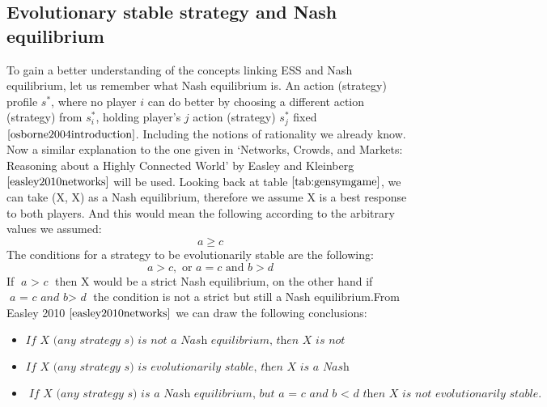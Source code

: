 \subsection{Evolutionary stable strategy and Nash equilibrium} \label{EESNE}
To gain a better understanding of the concepts linking ESS and Nash equilibrium, let us remember what Nash equilibrium is. 
An action (strategy) profile $s^*$, where no player $\textit{i}$ can do better by choosing a different action (strategy) from $s^*_i$, holding player’s $\textit{j}$ action (strategy) $s^*_{j}$ fixed $\cite{osborne2004introduction}$.  Including the notions of rationality we already know.   
Now a similar explanation to the one given in `Networks, Crowds, and Markets: Reasoning about a Highly Connected World'  by Easley and Kleinberg$\cite{easley2010networks}$ will be used.
Looking back at table $\ref{tab:gensymgame}$, we can take (X, X) as a Nash equilibrium, therefore we assume X is a best response to both players. And this would mean the following according to the arbitrary values we assumed:
\begin{equation}
{a \geq c}
\end{equation}
The conditions for a strategy to be evolutionarily stable are the following:
\begin{equation}
{a > c, \text{ or } a = c \text{ and } b > d}
\end{equation}
If $\textit{a $>$ c}$ then X would be a strict Nash equilibrium, on the other hand if $\textit{a = c and b$>$ d}$ the condition is not a strict but still a Nash equilibrium.From Easley 2010 $\cite{easley2010networks}$ we can draw the following conclusions:

\begin{itemize}
\item $\textit{If X (any strategy s) is not a Nash equilibrium, then X is not evolutionarily stable.}$ 
\item $\textit{If X (any strategy s) is evolutionarily stable, then X is a Nash equilibrium.}$ 
\item $\textit{If X (any strategy s) is a Nash equilibrium, but  $\textit{a = c and b $<$ d}$ then X is not evolutionarily stable.}$
\end{itemize}

